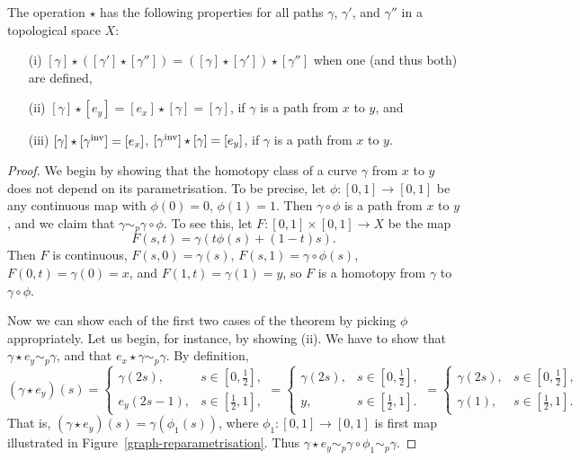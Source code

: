 \begin{thm}
  The operation $\star$ has the following properties for all paths $\gamma$, $\gamma'$, and $\gamma''$ in a topological space $X$:
  \begin{itemize}
    \item[(i)] $[\gamma] \star ([\gamma'] \star [\gamma'']) = ([\gamma] \star [\gamma']) \star [\gamma'']$ when one (and thus both) are defined,
    \item[(ii)] $[\gamma] \star [e_y] = [e_x] \star [\gamma] = [\gamma]$, if $\gamma$ is a path from $x$ to $y$, and
    \item[(iii)] $[\gamma] \star [\gamma^{\mathrm{inv}}] = [e_x]$, $[\gamma^{\mathrm{inv}}] \star [\gamma] = [e_y]$, if $\gamma$ is a path from $x$ to $y$.
  \end{itemize}
\end{thm}
\begin{proof}
  We begin by showing that the homotopy class of a curve $\gamma$ from $x$ to $y$ does not depend on its parametrisation. To be precise, let $\phi : [0,1] \to [0,1]$ be any continuous map with $\phi(0) = 0$, $\phi(1) = 1$. Then $\gamma \circ \phi$ is a path from $x$ to $y$, and we claim that $\gamma \sim_p \gamma \circ \phi$. To see this, let $F : [0,1] \times [0,1] \to X$ be the map
  \[
    F(s,t) = \gamma(t\phi(s) + (1-t)s).
  \]
  Then $F$ is continuous, $F(s,0) = \gamma(s)$, $F(s,1) = \gamma \circ \phi(s)$, $F(0,t) = \gamma(0) = x$, and $F(1,t) = \gamma(1) = y$, so $F$ is a homotopy from $\gamma$ to $\gamma \circ \phi$.
  
  Now we can show each of the first two cases of the theorem by picking $\phi$ appropriately. Let us begin, for instance, by showing (ii). We have to show that $\gamma \star e_y \sim_p \gamma$, and that $e_x \star \gamma \sim_p \gamma$. By definition,
  \[
    (\gamma \star e_y) (s) = \begin{cases} \gamma(2s), & s \in [0,\tfrac{1}{2}], \\ e_y(2s-1), & s \in [\tfrac{1}{2},1], \end{cases} = \begin{cases} \gamma(2s), & s \in [0,\tfrac{1}{2}], \\ y, & s \in [\tfrac{1}{2},1]. \end{cases} = \begin{cases} \gamma(2s), & s \in [0,\tfrac{1}{2}], \\ \gamma(1), & s \in [\tfrac{1}{2},1]. \end{cases}
  \]
  That is, $(\gamma \star e_y)(s) = \gamma(\phi_1(s))$, where $\phi_1 : [0,1] \to [0,1]$ is first map illustrated in Figure~\ref{graph-reparametrisation}. Thus $\gamma \star e_y \sim_p \gamma \circ \phi_1 \sim_p \gamma$.
  

\end{proof}
